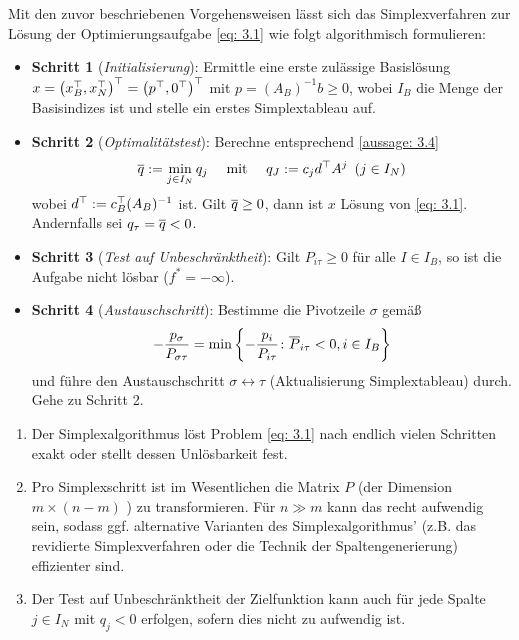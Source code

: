 Mit den zuvor beschriebenen Vorgehensweisen lässt sich das Simplexverfahren zur Lösung der Optimierungsaufgabe \eqref{eq: 3.1} wie folgt algorithmisch formulieren:
\begin{itemize}
	\item \textbf{Schritt 1} (\textit{Initialisierung}): Ermittle eine erste zulässige Basislösung $x = \left( x_B^{\top}, x_N^{\top} \right)^{\top} = \left( p^{\top}, 0^{\top} \right)^{\top}$ mit $p = (A_B)^{-1} b \ge 0$, wobei $I_B$ die Menge der Basisindizes ist und stelle ein erstes Simplextableau auf.
	\item \textbf{Schritt 2} (\textit{Optimalitätstest}): Berechne entsprechend \cref{aussage: 3.4}
	\begin{equation}
		\overline{q} \mathrel{:=} \min_{j \in I_N} q_j \quad \text{ mit } \quad q_J \mathrel{:=} c_j d^{\top} A^j \enskip (j \in I_N)
		\label{eq: 3.10}
	\end{equation}
	wobei $d^{\top} \mathrel{:=} c_B^{\top} (A_B)^{-1}$ ist. Gilt $\overline{q} \ge 0$, dann ist $x$ Lösung von \eqref{eq: 3.1}. Andernfalls sei $q_\tau = \overline{q} < 0$.
	\item \textbf{Schritt 3} (\textit{Test auf Unbeschränktheit}): Gilt $P_{i \tau} \ge 0$ für alle $I \in I_B$, so ist die Aufgabe nicht lösbar ($f^\ast = -\infty$).
	\item \textbf{Schritt 4} (\textit{Austauschschritt}): Bestimme die Pivotzeile $\sigma$ gemäß
	\begin{equation*}
		- \frac{p_\sigma}{P_{\sigma \tau}} = \min \left\{ - \frac{p_i}{P_{i \tau}} \colon \overline{P}_{i \tau} < 0, i \in I_B \right\}
	\end{equation*}
	und führe den Austauschschritt $\sigma \leftrightarrow \tau$ (Aktualisierung Simplextableau) durch. Gehe zu Schritt 2.
\end{itemize}

\begin{bemerkung} %
	\begin{enumerate}[label=(\roman*), nolistsep, topsep=-\parskip]
		\item Der Simplexalgorithmus löst Problem \eqref{eq: 3.1} nach endlich vielen Schritten exakt oder stellt dessen Unlösbarkeit fest.
		\item Pro Simplexschritt ist im Wesentlichen die Matrix $P$ (der Dimension $m \times (n-m)$ ) zu transformieren. Für $n \gg m$ kann das recht aufwendig sein, sodass ggf. alternative Varianten des Simplexalgorithmus' (z.B. das revidierte Simplexverfahren oder die Technik der Spaltengenerierung) effizienter sind.
		\item Der Test auf Unbeschränktheit der Zielfunktion kann auch für jede Spalte $j \in I_N$ mit $q_j < 0$ erfolgen, sofern dies nicht zu aufwendig ist.
	\end{enumerate}
\end{bemerkung}